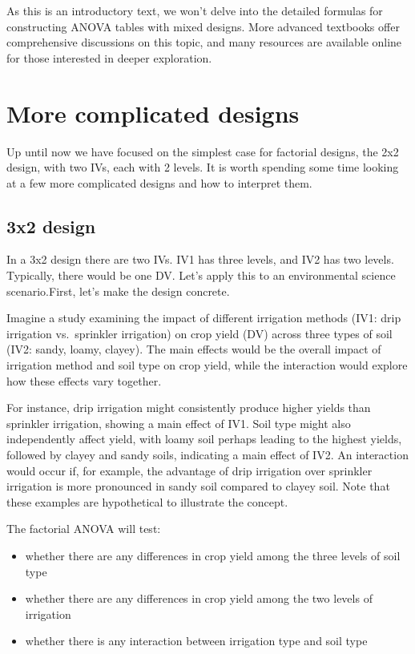 \documentclass[
  letterpaper,
  DIV=11,
  numbers=noendperiod]{scrreprt}
\providecommand{\tightlist}{%
  \setlength{\itemsep}{0pt}\setlength{\parskip}{0pt}}\usepackage{longtable,booktabs,array}
\begin{document}
As this is an introductory text, we won't delve into the detailed
formulas for constructing ANOVA tables with mixed designs. More advanced
textbooks offer comprehensive discussions on this topic, and many
resources are available online for those interested in deeper
exploration.

\section{More complicated designs}\label{more-complicated-designs}

Up until now we have focused on the simplest case for factorial designs,
the 2x2 design, with two IVs, each with 2 levels. It is worth spending
some time looking at a few more complicated designs and how to interpret
them.

\subsection{3x2 design}\label{x2-design}

In a 3x2 design there are two IVs. IV1 has three levels, and IV2 has two
levels. Typically, there would be one DV. Let's apply this to an
environmental science scenario.First, let's make the design concrete.

Imagine a study examining the impact of different irrigation methods
(IV1: drip irrigation vs.~sprinkler irrigation) on crop yield (DV)
across three types of soil (IV2: sandy, loamy, clayey). The main effects
would be the overall impact of irrigation method and soil type on crop
yield, while the interaction would explore how these effects vary
together.

For instance, drip irrigation might consistently produce higher yields
than sprinkler irrigation, showing a main effect of IV1. Soil type might
also independently affect yield, with loamy soil perhaps leading to the
highest yields, followed by clayey and sandy soils, indicating a main
effect of IV2. An interaction would occur if, for example, the advantage
of drip irrigation over sprinkler irrigation is more pronounced in sandy
soil compared to clayey soil. Note that these examples are hypothetical
to illustrate the concept.

The factorial ANOVA will test:

\begin{itemize}
\tightlist
\item
  whether there are any differences in crop yield among the three levels
  of soil type
\item
  whether there are any differences in crop yield among the two levels
  of irrigation
\item
  whether there is any interaction between irrigation type and soil type
\end{itemize}
\end{document}

